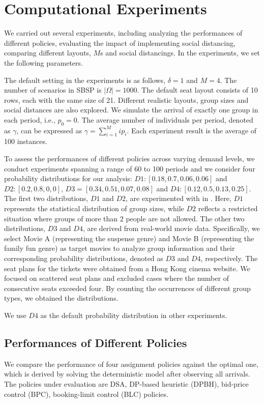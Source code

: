 \section{Computational Experiments}\label{sec_result}
We carried out several experiments, including analyzing the performances of different policies, evaluating the impact of implementing social distancing, comparing different layouts, $M$s and social distancings. In the experiments, we set the following parameters. 

The default setting in the experiments is as follows, $\delta =1$ and $M =4$. The number of scenarios in SBSP is $|\Omega| = 1000$. The default seat layout consists of 10 rows, each with the same size of 21. Different realistic layouts, group sizes and social distances are also explored. We simulate the arrival of exactly one group in each period, i.e., $p_0 = 0$. The average number of individuals per period, denoted as $\gamma$, can be expressed as $\gamma = \sum_{i=1}^{M} i p_i$. Each experiment result is the average of 100 instances.

To assess the performances of different policies across varying demand levels, we conduct experiments spanning a range of 60 to 100 periods and we consider four probability distributions for our analysis: $D1:[0.18,0.7,0.06,0.06]$ and $D2:[0.2,0.8,0,0]$, $D3 = [0.34, 0.51, 0.07, 0.08]$ and $D4: [0.12, 0.5, 0.13, 0.25]$. The first two distributions, $D1$ and $D2$, are experimented with in \cite{blom2022filling}. Here, $D1$ represents the statistical distribution of group sizes, while $D2$ reflects a restricted situation where groups of more than 2 people are not allowed. The other two distributions, $D3$ and $D4$, are derived from real-world movie data. Specifically, we select Movie A (representing the suspense genre) and Movie B (representing the family fun genre) as target movies to analyze group information and their corresponding probability distributions, denoted as $D3$ and $D4$, respectively. The seat plans for the tickets were obtained from a Hong Kong cinema website. We focused on scattered seat plans and excluded cases where the number of consecutive seats exceeded four. By counting the occurrences of different group types, we obtained the distributions. 

We use $D4$ as the default probability distribution in other experiments.


\subsection{Performances of Different Policies}
We compare the performance of four assignment policies against the optimal one, which is derived by solving the deterministic model after observing all arrivals. The policies under evaluation are DSA, DP-based heuristic (DPBH), bid-price control (BPC), booking-limit control (BLC) policies.

